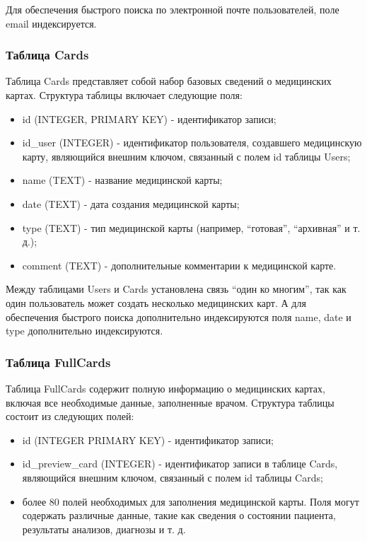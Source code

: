 Для обеспечения быстрого поиска по электронной почте пользователей, поле email индексируется.

\subsubsection{Таблица Cards}

Таблица Cards представляет собой набор базовых сведений о медицинских картах. Структура таблицы включает следующие поля:
\begin{itemize}
    \item id (INTEGER, PRIMARY KEY) - идентификатор записи;
    \item id\_user (INTEGER) - идентификатор пользователя, создавшего медицинскую карту, являющийся внешним ключом, связанный с полем id таблицы Users;
    \item name (TEXT) - название медицинской карты;
    \item date (TEXT) - дата создания медицинской карты;
    \item type (TEXT) - тип медицинской карты (например, \enquote{готовая}, \enquote{архивная} и т. д.);
    \item comment (TEXT) - дополнительные комментарии к медицинской карте.
\end{itemize}

Между таблицами Users и Cards установлена связь \enquote{один ко многим}, так как один пользователь может создать несколько медицинских карт. А для обеспечения быстрого поиска дополнительно индексируются поля name, date и type дополнительно индексируются.

\subsubsection{Таблица FullCards}

Таблица FullCards содержит полную информацию о медицинских картах, включая все необходимые данные, заполненные врачом. Структура таблицы состоит из следующих полей:
\begin{itemize}
    \item id (INTEGER PRIMARY KEY) - идентификатор записи;
    \item id\_preview\_card (INTEGER) - идентификатор записи в таблице Cards, являющийся внешним ключом, связанный с полем id таблицы Cards;
    \item более 80 полей необходимых для заполнения медицинской карты. Поля могут содержать различные данные, такие как сведения о состоянии пациента, результаты анализов, диагнозы и т. д.
\end{itemize}

